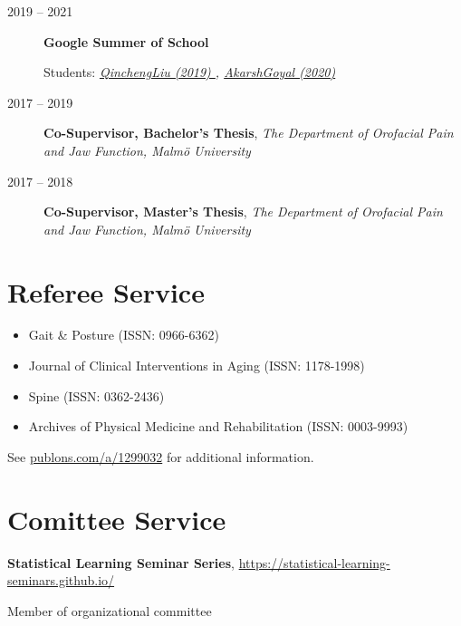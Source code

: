 \documentclass[
  10pt,
  headsepline=true,
  english,
  DIV=12
]{scrartcl}
\renewcommand*{%
  \mkbibnamegiven
}[1]{\ifitemannotation{highlight}{\textbf{#1}}{#1}}
\renewcommand*{%
  \mkbibnamefamily
}[1]{\ifitemannotation{highlight}{\textbf{#1}}{#1}}
\begin{document}
\begin{description}
  \item[2019 -- 2021]{
        \textbf{Google Summer of School}

        Students:
        \emph{
          \href  {

            https://summerofcode.withgoogle.com/archive/2019/projects/4654960430546944/
          }{
            QinchengLiu (2019)
          },
          \href  {

            https://summerofcode.withgoogle.com/dashboard/project/5459519376719872/overview
          }{
            AkarshGoyal (2020)
          }
        } }
  \item[2017 -- 2019] {
        \textbf{Co-Supervisor, Bachelor's Thesis}, \emph{The Department of
          Orofacial Pain and Jaw Function, Malmö University}

        }
  \item[2017 -- 2018] {
        \textbf{Co-Supervisor, Master's Thesis}, \emph{The Department of
          Orofacial Pain and Jaw Function, Malmö University}

        }
\end{description}

\hypertarget{reviewer}{%
  \section{Referee Service}\label{reviewer}}

\begin{itemize}
  \item Gait \& Posture (ISSN: 0966-6362)
  \item Journal of Clinical Interventions in Aging (ISSN: 1178-1998)
  \item Spine (ISSN: 0362-2436)
  \item Archives of Physical Medicine and Rehabilitation (ISSN: 0003-9993)
\end{itemize}
See \href{http://publons.com/a/1299032}{publons.com/a/1299032} for
additional information.

\section{Comittee Service}
\begin{description}[
    labelwidth = \widthof{2020} + 1em,
    leftmargin = \widthof{2020} + 1em,
  ]
  \item[2020]{
        \textbf{Statistical Learning Seminar Series},
        \url{https://statistical-learning-seminars.github.io/}

        Member of organizational committee
        }
\end{description}
\end{document}
